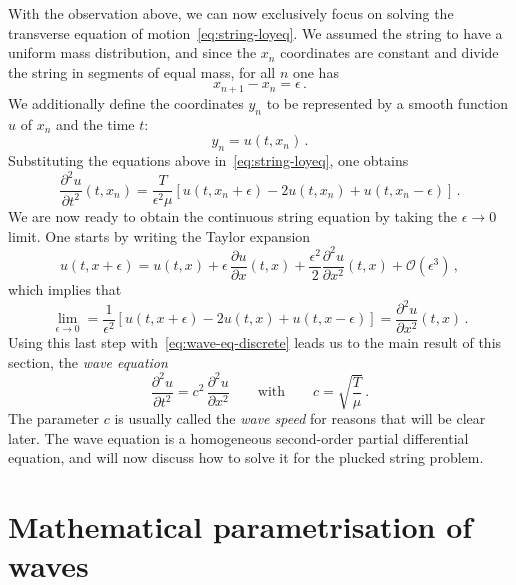 With the observation above, we can now exclusively focus on solving the transverse
equation of motion~\cref{eq:string-loyeq}. We assumed the string to have a uniform mass
distribution, and since the $x_n$ coordinates are constant and divide the string in
segments of equal mass, for all $n$ one has
\begin{equation}
  x_{n+1}-x_n=\epsilon\,.
\end{equation}
We additionally define the coordinates $y_n$ to be represented by a smooth function $u$ of
$x_n$ and the time $t$:
\begin{equation}
  y_n=u(t,x_n)\,.
\end{equation}
Substituting the equations above in~\cref{eq:string-loyeq}, one obtains
\begin{equation}
  \frac{\partial^2 u}{\partial t^2}(t,x_n)=\frac{T}{\epsilon^2\mu}
  [u(t,x_{n}+\epsilon)-2u(t,x_{n})+u(t,x_{n}-\epsilon)]\,.\label{eq:wave-eq-discrete}
\end{equation}
We are now ready to obtain the continuous string equation by taking the $\epsilon\to 0$
limit. One starts by writing the Taylor expansion
\begin{equation}
  u(t,x+\epsilon)=u(t,x)+\epsilon\,\frac{\partial u}{\partial x}(t,x)
  +\frac{\epsilon^2}{2}\frac{\partial^2 u}{\partial x^2}(t,x)+\mathcal{O}(\epsilon^3)\,,
\end{equation}
which implies that
\begin{equation}
  \lim_{\epsilon\to 0}=\frac{1}{\epsilon^2}
  [u(t,x+\epsilon)-2u(t,x)+u(t,x-\epsilon)]=\frac{\partial^2 u}{\partial x^2}(t,x)\,.
\end{equation}
Using this last step with~\cref{eq:wave-eq-discrete} leads us to the main result of this
section, the \emph{wave equation}
\begin{equation}
  \frac{\partial^2 u}{\partial t^2}=c^2\,\frac{\partial^2 u}{\partial x^2}
  \qquad\text{with}\qquad
  c=\sqrt{\frac{T}{\mu}}\,.
\end{equation}
The parameter $c$ is usually called the \emph{wave speed} for reasons that will be clear
later. The wave equation is a homogeneous second-order partial differential equation, and
will now discuss how to solve it for the plucked string problem.
\section{Mathematical parametrisation of waves}
